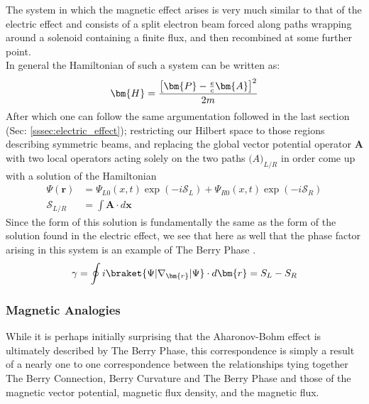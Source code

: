 \documentclass{article}
\begin{document}
The system in which the magnetic effect arises is very much similar to that of the electric effect and consists of a split electron beam forced along paths wrapping around a solenoid containing a finite flux, and then recombined at some further point.\\

In general the Hamiltonian of such a system can be written as:
\begin{equation*}
  \bm{H} = \frac{\left[ \bm{P} - \frac{e}{c}\bm{A} \right]^{2}}{2m} \\
\end{equation*}
After which one can follow the same argumentation followed in the last section (Sec: \ref{sssec:electric_effect}); restricting our Hilbert space to those regions describing symmetric beams, and replacing the global vector potential operator $\bm{A}$ with two local operators acting solely on the two paths $\bm(A)_{L/R}$ in order come up with a solution of the Hamiltonian
\begin{align*}
  \Psi(\bm{r})&=\Psi_{L0}(x,t)\exp(-i \mathcal{S}_{L}) + \Psi_{R0}(x,t)\exp(-i \mathcal{S}_{R})\\
  \mathcal{S}_{L/R} &= \int \bm{A} \cdot d\bm{x} 
\end{align*}
Since the form of this solution is fundamentally the same as the form of the solution found in the electric effect, we see that here as well that the phase factor arising in this system is an example of The Berry Phase \cite{Aharonov1959}.
  \begin{equation*}
    \gamma = \oint i\braket{\Psi|\nabla_{\bm{r}}|\Psi} \cdot d\bm{r} = S_{L} - S_{R}
  \end{equation*}

\subsubsection{Magnetic Analogies}

While it is perhaps initially surprising that the Aharonov-Bohm effect is ultimately described by The Berry Phase, this correspondence is simply a result of a nearly one to one correspondence between the relationships tying together The Berry Connection, Berry Curvature and The Berry Phase and those of the magnetic vector potential, magnetic flux density, and the magnetic flux.
\end{document}
